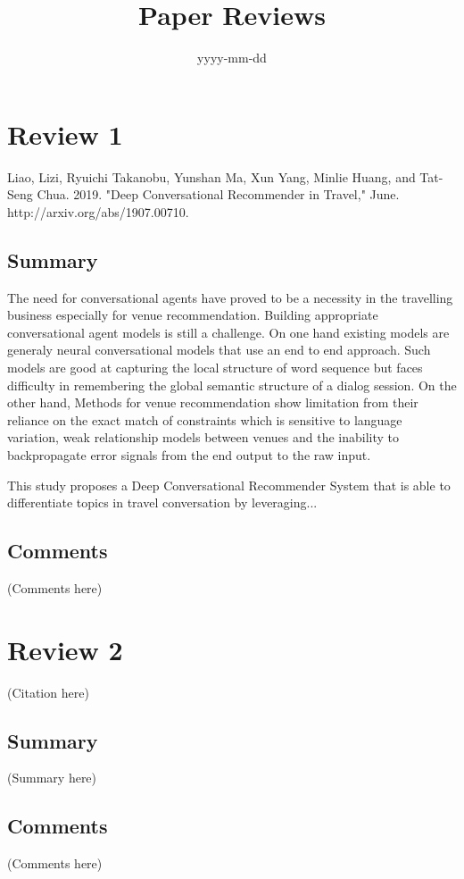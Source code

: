 \documentclass{article}
\begin{document}
\title{Paper Reviews}
\date{yyyy-mm-dd}
\maketitle

\section*{Review 1}
Liao, Lizi, Ryuichi Takanobu, Yunshan Ma, Xun Yang, Minlie Huang, 
and Tat-Seng Chua. 2019. "Deep Conversational Recommender in Travel," 
June. http://arxiv.org/abs/1907.00710.

\subsection*{Summary}
The need for conversational agents have proved to be a necessity in the 
travelling business especially for venue recommendation. Building appropriate 
conversational agent models is still a challenge. On one hand existing models 
are generaly neural conversational models that use an end to end approach. 
Such models are good at capturing the local structure of word sequence 
but faces difficulty in remembering the global semantic structure of a 
dialog session. On the other hand, Methods for venue recommendation show
limitation from their reliance on the exact match of constraints which is 
sensitive to language variation, weak relationship models between venues 
and the inability to backpropagate error signals from the end output to 
the raw input.

This study proposes a Deep Conversational Recommender System that is able to 
differentiate topics in travel conversation by leveraging...

\subsection*{Comments}
(Comments here)

\section*{Review 2}
(Citation here) 

\subsection*{Summary}
(Summary here)

\subsection*{Comments}
(Comments here)
\end{document}

